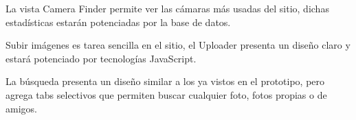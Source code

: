 \documentclass{memoria}
\begin{document}
\newpage

La vista Camera Finder permite ver las cámaras más usadas del sitio, dichas estadísticas estarán potenciadas por la base de datos.

Subir imágenes es tarea sencilla en el sitio, el Uploader presenta un diseño claro y estará potenciado por tecnologías JavaScript.

\newpage

La búsqueda presenta un diseño similar a los ya vistos en el prototipo, pero agrega tabs selectivos que permiten buscar cualquier foto, fotos propias o de amigos.
\end{document}
